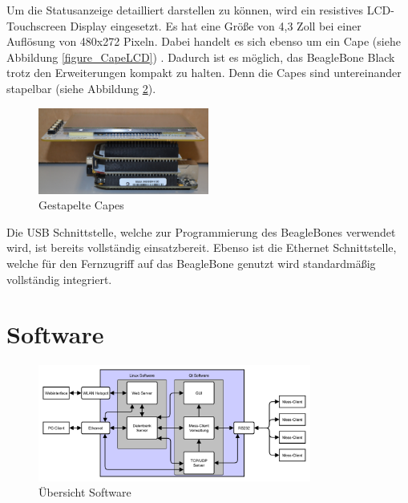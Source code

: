 Um die Statusanzeige detailliert darstellen zu können, wird ein resistives LCD-Touchscreen Display eingesetzt. Es hat eine Größe von 4,3 Zoll bei einer Auflösung von 480x272 Pixeln. Dabei handelt es sich ebenso um ein Cape (siehe Abbildung \ref{figure_CapeLCD}) . Dadurch ist es möglich, das BeagleBone Black trotz den Erweiterungen kompakt zu halten. Denn die Capes sind untereinander stapelbar (siehe Abbildung \ref{figure_GestapelteCapes}).\ 


\begin{figure}[H]
\begin{center}
\includegraphics[width=0.5\textwidth ]{img/general/GestapelteCapes2.JPG}
\caption{Gestapelte Capes}
\label{figure_GestapelteCapes}
\end{center}
\end{figure}

Die USB Schnittstelle, welche zur Programmierung des BeagleBones verwendet wird, ist bereits vollständig einsatzbereit. Ebenso ist die Ethernet Schnittstelle, welche für den Fernzugriff auf das BeagleBone genutzt wird standardmäßig vollständig integriert.

\section{Software}
\label{ServerSoftware}

\begin{figure}[H]
\begin{center}
\includegraphics[width=0.8\textwidth ]{img/general/UebersichtMasterSoftware.pdf}
\caption{Übersicht Software}
\label{figure_GestapelteCapes}
\end{center}
\end{figure}

